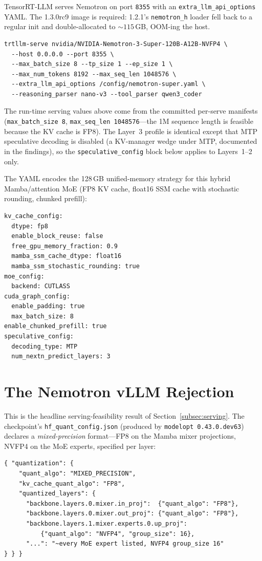 \documentclass[10pt,twocolumn]{article}
\newcommand{\code}[1]{\texttt{\small #1}}
\begin{document}
TensorRT-LLM serves Nemotron on port \code{8355} with an \code{extra\_llm\_api\_options} YAML.
The 1.3.0rc9 image is required: 1.2.1's \code{nemotron\_h} loader fell back to a regular init
and double-allocated to ${\sim}115$\,GB, OOM-ing the host.

\begin{lstlisting}
trtllm-serve nvidia/NVIDIA-Nemotron-3-Super-120B-A12B-NVFP4 \
  --host 0.0.0.0 --port 8355 \
  --max_batch_size 8 --tp_size 1 --ep_size 1 \
  --max_num_tokens 8192 --max_seq_len 1048576 \
  --extra_llm_api_options /config/nemotron-super.yaml \
  --reasoning_parser nano-v3 --tool_parser qwen3_coder
\end{lstlisting}

The run-time serving values above come from the committed per-serve manifests
(\code{max\_batch\_size 8}, \code{max\_seq\_len 1048576}---the 1M sequence length is feasible
because the KV cache is FP8). The Layer~3 profile is identical except that MTP speculative
decoding is disabled (a KV-manager wedge under MTP, documented in the findings), so the
\code{speculative\_config} block below applies to Layers~1--2 only.

The YAML encodes the 128\,GB unified-memory strategy for this hybrid Mamba/attention MoE
(FP8 KV cache, float16 SSM cache with stochastic rounding, chunked prefill):

\begin{lstlisting}
kv_cache_config:
  dtype: fp8
  enable_block_reuse: false
  free_gpu_memory_fraction: 0.9
  mamba_ssm_cache_dtype: float16
  mamba_ssm_stochastic_rounding: true
moe_config:
  backend: CUTLASS
cuda_graph_config:
  enable_padding: true
  max_batch_size: 8
enable_chunked_prefill: true
speculative_config:
  decoding_type: MTP
  num_nextn_predict_layers: 3
\end{lstlisting}

\section{The Nemotron vLLM Rejection}
\label{app:nemotron}

This is the headline serving-feasibility result of Section~\ref{subsec:serving}. The checkpoint's
\code{hf\_quant\_config.json} (produced by \code{modelopt 0.43.0.dev63}) declares a
\emph{mixed-precision} format---FP8 on the Mamba mixer projections, NVFP4 on the MoE experts,
specified per layer:

\begin{lstlisting}
{ "quantization": {
    "quant_algo": "MIXED_PRECISION",
    "kv_cache_quant_algo": "FP8",
    "quantized_layers": {
      "backbone.layers.0.mixer.in_proj":  {"quant_algo": "FP8"},
      "backbone.layers.0.mixer.out_proj": {"quant_algo": "FP8"},
      "backbone.layers.1.mixer.experts.0.up_proj":
          {"quant_algo": "NVFP4", "group_size": 16},
      "...": "~every MoE expert listed, NVFP4 group_size 16"
} } }
\end{lstlisting}
\end{document}
